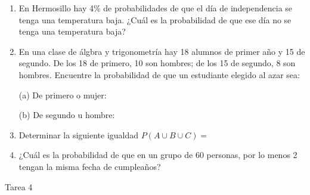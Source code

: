 \documentclass[a4paper, 12pt]{article}
\newcommand{\Pspace}{0.5cm}
\newcommand{\Aspace}{0.2cm}
\begin{document}
\begin{enumerate}
    \item En Hermosillo hay 4\% de probabilidades de que el día de independencia se tenga una temperatura baja. ¿Cuál es la probabilidad de que ese día no se tenga una temperatura baja?
    \vspace{\Aspace} \par
    { \color{azul}  }


    \vspace{\Pspace}
    \item En una clase de álgbra y trigonometría hay 18 alumnos de primer año y 15 de segundo. De los 18 de primero, 10 son hombres; de los 15 de segundo, 8 son hombres. Encuentre la probabilidad de que un estudiante elegido al azar sea:
    \vspace{\Aspace} \par
    (a) De primero o mujer:
    \\ { \color{azul}  }

    \vspace{\Aspace}
    (b) De segundo u hombre:
    \\ { \color{azul}  }


    \vspace{\Pspace}
    \item Determinar la siguiente igualdad $P(A \cup B \cup C) =$
    \vspace{\Aspace} \par
    { \color{azul}  }


    \vspace{\Pspace}
    \item ¿Cuál es la probabilidad de que en un grupo de 60 personas, por lo menos 2 tengan la misma fecha de cumpleaños?
    \vspace{\Aspace} \par
    { \color{azul}  } 
\end{enumerate}



\newpage
\begin{center}
    { \LARGE Tarea 4}
\end{center}
\end{document}
